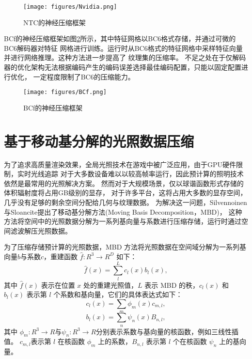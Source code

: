 \begin{figure}[htbp]
    \centering
    \texttt{[image: figures/Nvidia.png]}
    \caption{NTC的神经压缩框架\cite{vaidyanathan2023random}}
    \label{fig:Nvidia}
\end{figure}

BCf\cite{weinreich2024real}的神经压缩框架如图\ref{fig:BCf}所示，其中特征网格以BC6格式存储，并通过可微的BC6解码器对特征
网格进行训练。运行时从BC6格式的特征网格中采样特征向量并进行网络推理。这种方法进一步提高了
纹理集的压缩率。
不足之处在于仅解码器的优化架构无法根据编码产生的编码误差选择最佳编码配置，只能以固定配置进行优化，
一定程度限制了BC6的压缩能力。

\begin{figure}[htbp]
    \centering
    \texttt{[image: figures/BCf.png]}
    \caption{BCf的神经压缩框架\cite{weinreich2024real}}
    \label{fig:BCf}
\end{figure}


\section{基于移动基分解的光照数据压缩}

为了追求高质量渲染效果，全局光照技术在游戏中被广泛应用，由于GPU硬件限制，实时光线追踪
对于大多数设备难以以较高帧率运行，因此预计算的照明技术依然是最常用的光照解决方案。
然而对于大规模场景，仅以球谐函数形式存储的体积辐射度将占用GB级别的显存\cite{silvennoinen2021moving}，
对于许多平台，这将占用大多数的显存空间，几乎没有足够的剩余空间分配给几何与纹理数据。
为解决这一问题，Silvennoinen与Sloancite\cite{silvennoinen2021moving}提出了移动基分解方法(Moving Basis Decomposition，MBD)，
这种方法将空间中的光照数据分解为一系列基向量与系数进行压缩存储，运行时通过空间滤波解压光照数据。

为了压缩存储预计算的光照数据，MBD 方法将光照数据在空间域分解为一系列基向量$b$与系数$c$，重建函数 $\hat{f}:R^3\to R^D$ 如下：
\begin{equation}
\hat f(x)=\sum_{l}^L c_{l} (x)b_{l}(x),
\end{equation}
其中 $\hat{f}(x)$ 表示在位置 $x$ 处的重建光照值，$L$ 表示 MBD 的秩，$c_l(x)$ 和 $b_l(x)$ 表示第 $l$ 个系数和基向量，它们的具体表达式如下：
\begin{equation}
c_{l}(x)=\sum_{m}\phi_{m} (x)c_{m,l},
\end{equation}
\begin{equation}
b_{l}(x)=\sum_{n}\psi_{n} (x)B_{n,l},
\end{equation}
其中 $\phi_{m}: R^{3} \rightarrow R$与$\psi_{n}: R^{3} \rightarrow R$分别表示系数与基向量的核函数，例如三线性插值。 
$c_{m,l}$表示第 $l$ 在核函数 $\phi_m$ 上的系数，$B_{n,l}$ 表示第 $l$ 个在核函数 $\psi_n$ 上的基向量。

